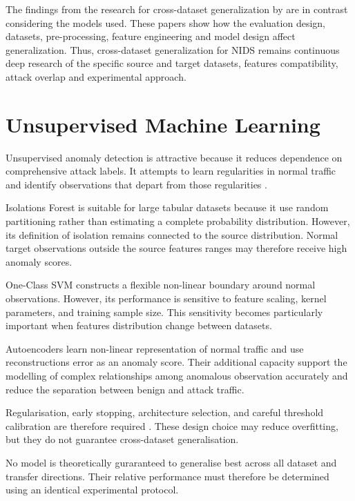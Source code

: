 The findings from the research for cross-dataset generalization by \cite{Chandra2025,Elangovan2026,Cantone2024} are in contrast considering the models used. 
These papers show how the evaluation design, datasets, pre-processing, feature engineering and model design affect generalization. Thus, cross-dataset generalization for 
NIDS remains continuous deep research of the specific source and target datasets, features compatibility, attack overlap and experimental approach.


\section{Unsupervised Machine Learning}
\label{subsec:literature-unsuperivsed-detection}

Unsupervised anomaly detection is attractive because it reduces dependence on comprehensive attack labels. It attempts to learn regularities in 
normal traffic and identify observations that depart from those regularities \cite{Pang2021,Chou2022}.

Isolations Forest is suitable for large tabular datasets because it use random partitioning rather than estimating a complete probability 
distribution. However, its definition of isolation remains connected to the source distribution. Normal target observations outside the source 
features ranges may therefore receive high anomaly scores.

One-Class SVM constructs a flexible non-linear boundary around normal observations. However, its performance is sensitive to feature scaling, 
kernel parameters, and training sample size. This sensitivity becomes particularly important when features distribution change between datasets.

Autoencoders learn non-linear representation of normal traffic and use reconstructions error as an anomaly score. Their additional capacity 
support the modelling of complex relationships among anomalous observation accurately and reduce the separation between benign and attack 
traffic.

Regularisation, early stopping, architecture selection, and careful threshold calibration are therefore required \cite{Pang2021,Yang2022}. 
These design choice may reduce overfitting, but they do not guarantee cross-dataset generalisation.

No model is theoretically guraranteed to generalise best across all dataset and transfer directions. Their relative performance must therefore 
be determined using an identical experimental protocol.   


